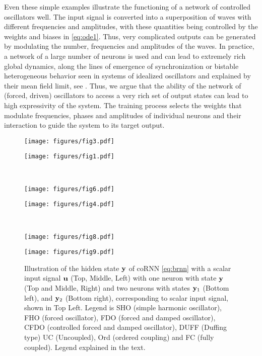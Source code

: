 \documentclass{article} \usepackage{iclr2021_conference,times}
\newcommand{\by}{{\bf y}}
\newcommand{\bu}{{\bf u}}
\begin{document}
Even these simple examples illustrate the functioning of a network of controlled oscillators well. The input signal is converted into a superposition of waves with different frequencies and amplitudes, with these quantities being controlled by the weights and biases in \eqref{eq:ode1}. Thus, very complicated outputs can be generated by modulating the number, frequencies and amplitudes of the waves. In practice, a network of a large number of neurons is used and can lead to extremely rich global dynamics, along the lines of emergence of synchronization or bistable heterogeneous behavior seen in systems of idealized oscillators and explained by their mean field limit, see \cite{KUR,WIN,stgz1}. Thus, we argue that the ability of the network of (forced, driven) oscillators to access a very rich set of output states can lead to high expressivity of the system. The training process selects the weights that modulate frequencies, phases and amplitudes of individual neurons and their interaction to guide the system to its target output. 
\begin{figure}[ht!]
\begin{minipage}{.5\textwidth}
\texttt{[image: figures/fig3.pdf]}
\end{minipage}\begin{minipage}{.5\textwidth}
\texttt{[image: figures/fig1.pdf]}
\end{minipage} \\
\begin{minipage}{.5\textwidth}
\texttt{[image: figures/fig6.pdf]}
\end{minipage}\begin{minipage}{.5\textwidth}
\texttt{[image: figures/fig4.pdf]}
\end{minipage}
 \\
\begin{minipage}{.5\textwidth}
\texttt{[image: figures/fig8.pdf]}
\end{minipage}
\begin{minipage}{.5\textwidth}
\texttt{[image: figures/fig9.pdf]}
\end{minipage} 
\caption{Illustration of the hidden state $\by$ of coRNN \eqref{eq:brnn} with a scalar input signal $\bu$ (Top, Middle, Left) with one neuron with state $\by$ (Top and Middle, Right) and two neurons with states $\by_1$ (Bottom left), and $\by_2$ (Bottom right), corresponding to scalar input signal, shown in Top Left. Legend is SHO (simple harmonic oscillator), FHO (forced oscillator), FDO (forced and damped oscillator), CFDO (controlled forced and damped oscillator), DUFF (Duffing type) UC (Uncoupled), Ord (ordered coupling) and FC (fully coupled). Legend explained in the text.}
\label{fig:1}
\end{figure}
\end{document}
